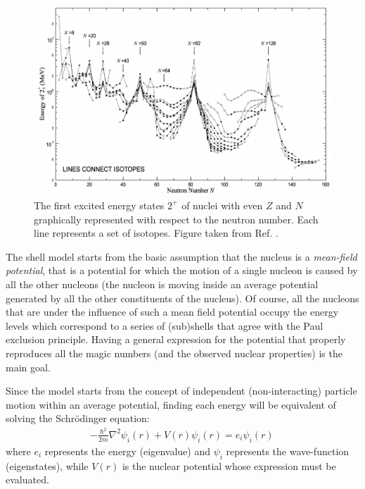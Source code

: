 \begin{figure}
    \centering
    \includegraphics[scale=0.33]{Chapters/Figures/E2plus_neutron.pdf}
    \caption{The first excited energy states $2^+$ of nuclei with even $Z$ and $N$ graphically represented with respect to the neutron number. Each line represents a set of isotopes. Figure taken from Ref. \cite{matta2017exotic}.}
    \label{e2plus_neutron}
\end{figure}

The shell model starts from the basic assumption that the nucleus is a \emph{mean-field potential}, that is a potential for which the motion of a single nucleon is caused by all the other nucleons (the nucleon is moving inside an average potential generated by all the other constituents of the nucleus). Of course, all the nucleons that are under the influence of such a mean field potential occupy the energy levels which correspond to a series of (sub)shells that agree with the Paul exclusion principle. Having a general expression for the potential that properly reproduces all the magic numbers (and the observed nuclear properties) is the main goal.

Since the model starts from the concept of independent (non-interacting) particle motion within an average potential, finding each energy will be equivalent of solving the Schrödinger equation:
\begin{align}
    -\frac{\hbar^2}{2m}\nabla ^2\psi_i(r)+V(r)\psi_i(r)=e_i\psi_i(r)\, 
    \label{schrodinger-single-particle-eq}
\end{align}
where $e_i$ represents the energy (eigenvalue) and $\psi_i$ represents the wave-function (eigenstates), while $V(r)$ is the nuclear potential whose expression must be evaluated.

